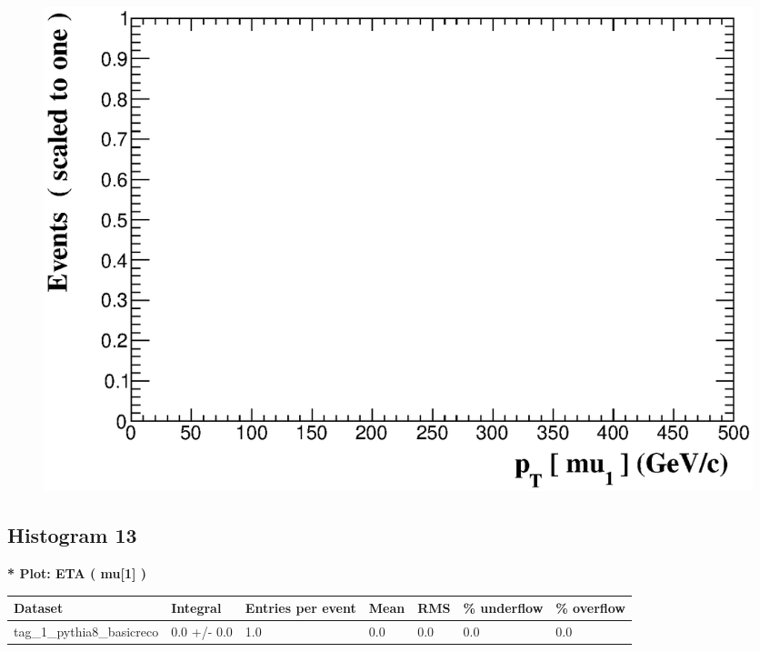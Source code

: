 \documentclass[a4paper, 10pt]{article}
\begin{document}
\begin{figure}[H]
  \begin{center}
    \includegraphics[scale=0.45]{selection_11.eps}\\
\caption{   }
  \end{center}
\end{figure}
      \newpage
\subsection{ Histogram 13}

\textbf{* Plot: ETA ( mu[1] ) }\\
   \begin{table}[H]
  \begin{center}
    \begin{tabular}{|m{23.0mm}|m{23.0mm}|m{18.0mm}|m{19.0mm}|m{19.0mm}|m{19.0mm}|m{19.0mm}|}
      \hline
      {\cellcolor{yellow}         Dataset}& {\cellcolor{yellow}         Integral}& {\cellcolor{yellow}         Entries per event}& {\cellcolor{yellow}         Mean}& {\cellcolor{yellow}         RMS}& {\cellcolor{yellow}         \% underflow}& {\cellcolor{yellow}         \% overflow}\\
      \hline
      {\cellcolor{white}         tag\_1\_pythia8\_basicreco}& {\cellcolor{white}         0.0 +/\-- 0.0}& {\cellcolor{white}         1.0}& {\cellcolor{white}         0.0}& {\cellcolor{white}         0.0}& {\cellcolor{green}         0.0}& {\cellcolor{green}         0.0}\\
\hline
    \end{tabular}
  \end{center}
\end{table}
\end{document}
